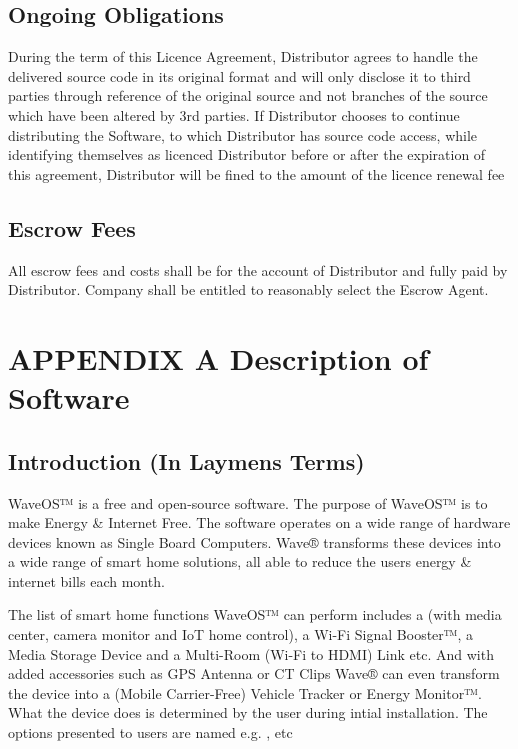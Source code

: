 \documentclass[letterpaper,10pt,english]{sphinxmanual}
\begin{document}
\subsection{Ongoing Obligations}
\label{\detokenize{escrow:ongoing-obligations}}
During the term of this Licence Agreement, Distributor agrees to handle the delivered source code in its original format and will only disclose it to third parties through reference of the original source and not branches of the source which have been altered by 3rd parties. If Distributor chooses to continue distributing the Software, to which Distributor has source code access, while identifying themselves as licenced Distributor before or after the expiration of this agreement, Distributor will be fined to the amount of the licence renewal fee


\subsection{Escrow Fees}
\label{\detokenize{escrow:escrow-fees}}
All escrow fees and costs shall be for the account of Distributor and fully paid by Distributor. Company shall be entitled to reasonably select the Escrow Agent.


\section{APPENDIX A \textendash{} Description of Software}
\label{\detokenize{appendix-a:appendix-a-description-of-software}}\label{\detokenize{appendix-a::doc}}


\subsection{Introduction (In Laymens Terms)}
\label{\detokenize{appendix-a:introduction-in-laymens-terms}}
WaveOS™ is a free and open-source software. The purpose of WaveOS™ is to make Energy \& Internet Free. The software operates on a wide range of hardware devices known as Single Board Computers. Wave® transforms these devices into a wide range of smart home solutions, all able to reduce the users energy \& internet bills each month.

The list of smart home functions WaveOS™ can perform includes a  (with media center, camera monitor and IoT home control), a Wi-Fi Signal Booster™, a Media Storage Device and a Multi-Room (Wi-Fi to HDMI) Link etc. And with added accessories such as GPS Antenna or CT Clips Wave® can even transform the device into a (Mobile Carrier-Free) Vehicle Tracker or Energy Monitor™. What the device does is determined by the user during intial installation. The options presented to users are named  e.g. ,  etc
\end{document}
